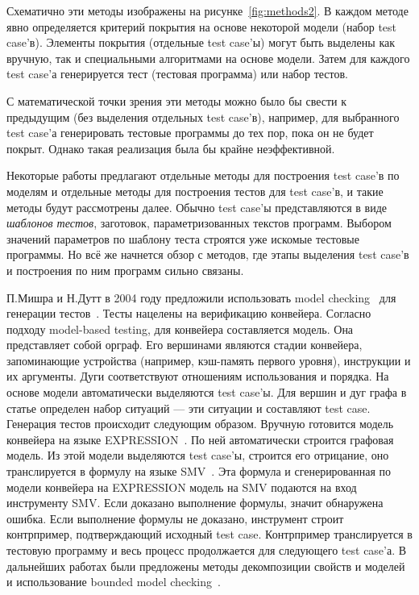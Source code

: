 \documentclass[14pt]{extreport}
\begin{document}
Схематично эти методы изображены на рисунке~\ref{fig:methods2}. В каждом методе явно определяется критерий покрытия на основе некоторой модели (набор test case'в). Элементы покрытия (отдельные test case'ы) могут быть выделены как вручную, так и специальными алгоритмами на основе модели. Затем для каждого test case'а генерируется тест (тестовая программа) или набор тестов.

С математической точки зрения эти методы можно было бы свести к предыдущим (без выделения отдельных test case'в), например, для выбранного test case'а генерировать тестовые программы до тех пор, пока он не будет покрыт. Однако такая реализация была бы крайне неэффективной.%

Некоторые работы предлагают отдельные методы для построения test case'в по моделям и отдельные методы для построения тестов для test case'в, и такие методы будут рассмотрены далее. Обычно test case'ы представляются в виде \emph{шаблонов тестов}, заготовок, параметризованных текстов программ. Выбором значений параметров по шаблону теста строятся уже искомые тестовые программы. Но всё же начнется обзор с методов, где этапы выделения test case'в и построения по ним программ сильно связаны.


П.Мишра и Н.Дутт в 2004 году предложили использовать model checking~\cite{ModelChecking} для генерации тестов~\cite{MishraDutt04}. Тесты нацелены на верификацию конвейера. Согласно подходу model-based testing, для конвейера составляется модель. Она представляет собой орграф. Его вершинами являются стадии конвейера, запоминающие устройства (например, кэш-память первого уровня), инструкции и их аргументы. Дуги соответствуют отношениям использования и порядка. На основе модели автоматически выделяются test case'ы. Для вершин и дуг графа в статье определен набор ситуаций --- эти ситуации и составляют test case. Генерация тестов происходит следующим образом. Вручную готовится модель конвейера на языке EXPRESSION~\cite{EXPRESSION}. По ней автоматически строится графовая модель. Из этой модели выделяются test case'ы, строится его отрицание, оно транслируется в формулу на языке SMV~\cite{SMV}. Эта формула и сгенерированная по модели конвейера на EXPRESSION модель на SMV подаются на вход инструменту SMV. Если доказано выполнение формулы, значит обнаружена ошибка. Если выполнение формулы не доказано, инструмент строит контрпример, подтверждающий исходный test case. Контрпример транслируется в тестовую программу и весь процесс продолжается для следующего test case'а. В дальнейших работах были предложены методы декомпозиции свойств и моделей и использование bounded model checking~\cite{Mishra09}.
\end{document}
